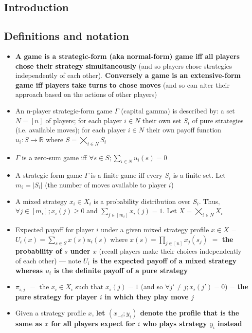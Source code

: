 \documentclass[20pt,a4paper,landscape]{extarticle}
\begin{document}
\tableofcontents
\clearpage
\begin{flushleft}
\section{Introduction}
\subsection{Definitions and notation}
\begin{itemize}
\item \textbf{A game is a strategic-form (aka normal-form) game iff all players chose their strategy simultaneously} (and so players chose strategies independently of each other). \textbf{Conversely a game is an extensive-form game iff players take turns to chose moves} (and so can alter their approach based on the actions of other players)
\item An n-player strategic-form game $\Gamma$ (capital gamma) is described by: a set $N = [n]$ of players; for each player $i \in N$ their own set $S_i$ of pure strategies (i.e. available moves); for each player $i \in N$ their own payoff function $u_i: S \to \mathds{R}$ where $S = \bigtimes_{i \in N} S_i$
\item $\Gamma$ is a zero-sum game iff $\forall s \in S; \sum_{i \in N} u_i(s) = 0$
\item A strategic-form game $\Gamma$ is a finite game iff every $S_i$ is a finite set. Let $m_i = |S_i|$ (the number of moves available to player $i$)
\item A mixed strategy $x_i \in X_i$ is a probability distribution over $S_i$. Thus, $\forall j \in [m_i]; x_i(j) \geq 0$ and $\sum_{j \in [m_i]} x_i(j) = 1$. Let $X = \bigtimes_{i \in N} X_i$
\item Expected payoff for player $i$ under a given mixed strategy profile $x \in X$ = $U_i(x) = \sum_{s \in S} x(s)u_i(s)$ where \textbf{\boldmath$x(s) = \prod_{j \in [n]} x_j(s_j)$ \boldmath$=$ the probability of \boldmath$s$ under \boldmath$x$} (recall players make their choices independently of each other) --- note \textbf{\boldmath$U_i$ is the expected payoff of a mixed strategy whereas \boldmath$u_i$ is the definite payoff of a pure strategy}
\item \textbf{\boldmath$\pi_{i,j}$ \boldmath$=$} the $x_i \in X_i$ such that $x_i(j) =1$ (and so $\forall j' \neq j; x_i(j') = 0$) = \textbf{the pure strategy for player \boldmath$i$ in which they play move \boldmath$j$}
\item Given a strategy profile $x$, \textbf{let \boldmath$\left(x_{-i}; y_i\right)$ denote the profile that is the same as $x$ for all players expect for $i$ who plays strategy $y_i$ instead}
\end{itemize}

\end{flushleft}
\end{document}
